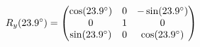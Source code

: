 \documentclass[preview]{standalone}
\begin{document}
\begin{align*}
\special{dvisvgm:raw <g id='unique000'>}R_y(23.9^\circ) = \begin{pmatrix} \cos(23.9^\circ) & 0 & -\sin(23.9^\circ) \\ 0 & 1 & 0 \\ \sin(23.9^\circ) & 0 & \cos(23.9^\circ) \end{pmatrix}\special{dvisvgm:raw </g>}
\end{align*}
\end{document}
